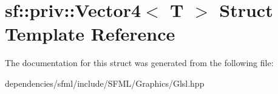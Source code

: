 \hypertarget{structsf_1_1priv_1_1_vector4}{}\section{sf\+:\+:priv\+:\+:Vector4$<$ T $>$ Struct Template Reference}
\label{structsf_1_1priv_1_1_vector4}


The documentation for this struct was generated from the following file\+:\begin{DoxyCompactItemize}
\item 
dependencies/sfml/include/\+S\+F\+M\+L/\+Graphics/Glsl.\+hpp\end{DoxyCompactItemize}
